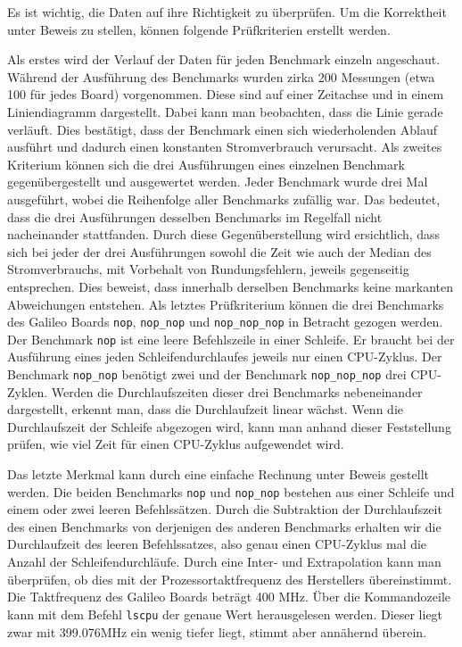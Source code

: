 Es ist wichtig, die Daten auf ihre Richtigkeit zu überprüfen. Um die Korrektheit unter Beweis zu stellen, können folgende Prüfkriterien erstellt werden.
\par
Als erstes wird der Verlauf der Daten für jeden Benchmark einzeln angeschaut. Während der Ausführung des Benchmarks wurden zirka 200 Messungen (etwa 100 für jedes Board) vorgenommen. Diese sind auf einer Zeitachse und in einem Liniendiagramm dargestellt. Dabei kann man beobachten, dass die Linie gerade verläuft. Dies bestätigt, dass der Benchmark einen sich wiederholenden Ablauf ausführt und dadurch einen konstanten Stromverbrauch verursacht. Als zweites Kriterium können sich die drei Ausführungen eines einzelnen Benchmark gegenübergestellt und ausgewertet werden. Jeder Benchmark wurde drei Mal ausgeführt, wobei die Reihenfolge aller Benchmarks zufällig war. Das bedeutet, dass die drei Ausführungen desselben Benchmarks im Regelfall nicht nacheinander stattfanden. Durch diese Gegenüberstellung wird ersichtlich, dass sich bei jeder der drei Ausführungen sowohl die Zeit wie auch der Median des Stromverbrauchs, mit Vorbehalt von Rundungsfehlern, jeweils gegenseitig entsprechen. Dies beweist, dass innerhalb derselben Benchmarks keine markanten Abweichungen entstehen. Als letztes Prüfkriterium können die drei Benchmarks des Galileo Boards \texttt{nop}, \texttt{nop\_nop} und \texttt{nop\_nop\_nop} in Betracht gezogen werden. Der Benchmark \texttt{nop} ist eine leere Befehlszeile in einer Schleife. Er braucht bei der Ausführung eines jeden Schleifendurchlaufes jeweils nur einen CPU-Zyklus. Der Benchmark \texttt{nop\_nop} benötigt zwei und der Benchmark \texttt{nop\_nop\_nop} drei CPU-Zyklen. Werden die Durchlaufszeiten dieser drei Benchmarks nebeneinander dargestellt, erkennt man, dass die Durchlaufzeit linear wächst. Wenn die Durchlaufszeit der Schleife abgezogen wird, kann man anhand dieser Feststellung prüfen, wie viel Zeit für einen CPU-Zyklus aufgewendet wird.
\par
Das letzte Merkmal kann durch eine einfache Rechnung unter Beweis gestellt werden. Die beiden Benchmarks \texttt{nop} und \texttt{nop\_nop} bestehen aus einer Schleife und einem oder zwei leeren Befehlssätzen. Durch die Subtraktion der Durchlaufszeit des einen Benchmarks von derjenigen des anderen Benchmarks erhalten wir die Durchlaufzeit des leeren Befehlssatzes, also genau einen CPU-Zyklus mal die Anzahl der Schleifendurchläufe. Durch eine Inter- und Extrapolation kann man überprüfen, ob dies mit der Prozessortaktfrequenz des Herstellers übereinstimmt. Die Taktfrequenz des Galileo Boards beträgt 400 MHz. Über die Kommandozeile kann mit dem Befehl \texttt{lscpu} der genaue Wert herausgelesen werden. Dieser liegt zwar mit 399.076MHz ein wenig tiefer liegt, stimmt aber annähernd überein.

